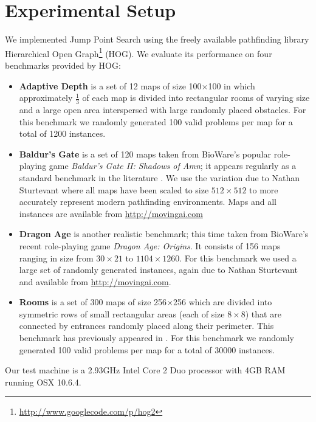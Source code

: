 \section{Experimental Setup}
\label{cha::jps::setup}
We implemented Jump Point Search using the freely available pathfinding library
Hierarchical Open Graph\footnote{\url{http://www.googlecode.com/p/hog2}} (HOG).
We evaluate its performance on four benchmarks provided by HOG:
\begin{itemize}

\item{\textbf{Adaptive Depth}
is a set of 12 maps of size 100$\times$100 in which approximately $\frac{1}{3}$
of each map is divided into rectangular rooms of varying size and a large
open area interspersed with large randomly placed obstacles.
For this benchmark we randomly generated 100 valid problems per map for a 
total of 1200 instances.
} 

\item{\textbf{Baldur's Gate} is a set of 120 maps taken from BioWare's popular
role-playing game \emph{Baldur's Gate II: Shadows of Amn}; it 
appears regularly as a standard benchmark in the literature
\citep{bjornsson06,harabor10,pochter10}.
We use the variation due to Nathan Sturtevant where all maps have been scaled to size
$512\times512$ to more accurately represent modern pathfinding environments.
Maps and all instances are available from \url{http://movingai.com}
}

\item{\textbf{Dragon Age} is another realistic benchmark; this time taken from
BioWare's recent role-playing game \emph{Dragon Age: Origins}.
It consists of 156 maps ranging in size 
from $30\times21$ to $1104\times1260$.
For this benchmark we used a large set of randomly generated instances,
again due to Nathan Sturtevant and available from \url{http://movingai.com}.
}

\item{\textbf{Rooms} is a set of 300 maps of size
256$\times$256 which are divided into symmetric rows of small 
rectangular areas (each of size $8\times8$) that are connected by entrances
randomly placed along their perimeter. This benchmark has
previously appeared in \citep{pochter10}.
For this benchmark we randomly generated 100 valid problems per map for a 
total of 30000 instances.
}
\end{itemize}

Our test machine is a 2.93GHz Intel Core 2 Duo processor with 4GB RAM running OSX 
10.6.4.  
